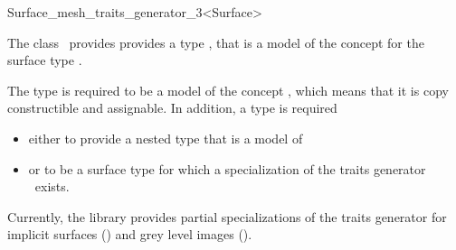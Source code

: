 

\begin{ccRefClass}{Surface_mesh_traits_generator_3<Surface>}  %


\ccDefinition
  
The class \ccRefName\ provides 
provides a type  , that is 
a model of the concept 
for the surface type .

The type  is required to be a model of the concept
,
which means that it is copy constructible
and assignable.
 In addition, a  type is required
\begin{itemize}
\item 
either to provide a nested type
that is a model of 
\item or to be a surface type for which a specialization
of the traits generator \ccRefName\ exists.
\end{itemize}
 

Currently, the library provides partial specializations
of  the   traits generator 
for implicit surfaces () and 
grey level images ().
 






\ccSeeAlso

  





\end{ccRefClass}


